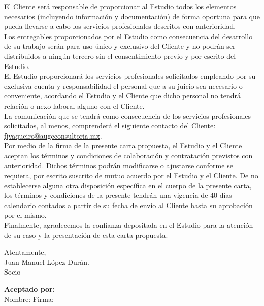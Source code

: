 \documentclass[5pt,letter]{report}
\begin{document}
El Cliente será responsable de proporcionar al Estudio todos los elementos necesarios 
(incluyendo información y documentación) de forma oportuna para que pueda llevarse a cabo 
los servicios profesionales descritos con anterioridad. \\ 

Los entregables proporcionados por el Estudio como consecuencia del desarrollo de su trabajo 
serán para uso único y exclusivo del Cliente y no podrán ser distribuidos a ningún tercero sin el 
consentimiento previo y por escrito del Estudio. \\ 

El Estudio proporcionará los servicios profesionales solicitados empleando por su exclusiva 
cuenta y responsabilidad el personal que a su juicio sea necesario o conveniente, acordando el 
Estudio y el Cliente que dicho personal no tendrá relación o nexo laboral alguno con el Cliente.  \\ 

La comunicación que se tendrá como consecuencia de los servicios profesionales solicitados, al 
menos, comprenderá el siguiente contacto del Cliente: \url{fjvaqueiro@augeconsultoria.mx}.  \\ 

Por medio de la firma de la presente carta propuesta, el Estudio y el Cliente aceptan los términos 
y condiciones de colaboración y contratación previstos con anterioridad. Dichos términos 
podrán modificarse o ajustarse conforme se requiera, por escrito suscrito de mutuo acuerdo por 
el Estudio y el Cliente. De no establecerse alguna otra disposición específica en el cuerpo de la 
presente carta, los términos y condiciones de la presente tendrán una vigencia de 40 días 
calendario contados a partir de su fecha de envío al Cliente hasta su aprobación por el mismo. \\ 

Finalmente, agradecemos la confianza depositada en el Estudio para la atención de su caso y la 
presentación de esta carta propuesta.

\begin{center}
	Atentamente, \\ 
	\vspace{2cm}
	Juan Manuel López Durán. \\ 
	Socio
\end{center}
\textbf{Aceptado por:} \\ 
\hfill 
Nombre: 
\hfill 
Firma:
\hfill 
\end{document}
